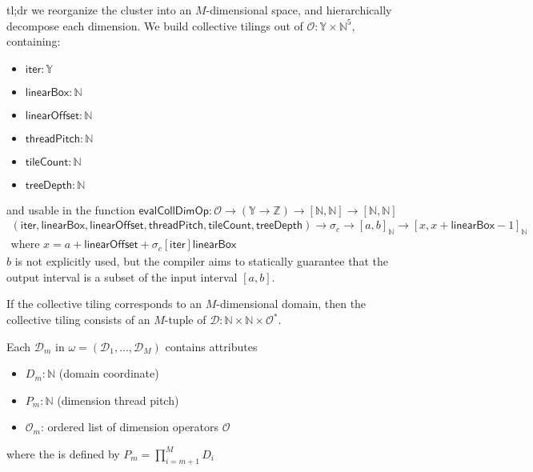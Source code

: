 tl;dr we reorganize the cluster into an $M$-dimensional space, and hierarchically decompose each dimension.
\filbreak
We build collective tilings out of  $\mathcal{O}: \mathbb{Y} \times \mathbb{N}^5$, containing:
\begin{itemize}
  \item $\mathsf{iter}: \mathbb{Y}$
  \filbreak
  \item $\mathsf{linearBox}: \mathbb{N}$
  \filbreak
  \item $\mathsf{linearOffset}: \mathbb{N}$
  \filbreak
  \item $\mathsf{threadPitch}: \mathbb{N}$
  \filbreak
  \item $\mathsf{tileCount}: \mathbb{N}$
  \filbreak
  \item $\mathsf{treeDepth}: \mathbb{N}$
\end{itemize}
\filbreak
and usable in the function $\mathsf{evalCollDimOp}: \mathcal{O} \to (\mathbb{Y} \to \mathbb{Z}) \to [\mathbb{N}, \mathbb{N}] \to [\mathbb{N}, \mathbb{N}]$
\begin{gather*}
    (\mathsf{iter}, \mathsf{linearBox}, \mathsf{linearOffset}, \mathsf{threadPitch}, \mathsf{tileCount}, \mathsf{treeDepth}) \to
    \sigma_c \to
    [a, b]_\mathbb{N} \to
    [x, x + \mathsf{linearBox} - 1]_\mathbb{N} \\
    \text{where } x = a + \mathsf{linearOffset} + \sigma_c[\mathsf{iter}] \mathsf{linearBox}
\end{gather*}
$b$ is not explicitly used, but the compiler aims to statically guarantee that the output interval is a subset of the input interval $[a, b]$.

\filbreak
If the collective tiling corresponds to an $M$-dimensional domain, then the collective tiling consists of an $M$-tuple of  $\mathcal{D}: \mathbb{N} \times \mathbb{N} \times \mathcal{O}^*$.

\filbreak
Each $\mathcal{D}_m$ in $\omega = (\mathcal{D}_1, ..., \mathcal{D}_M)$ contains attributes
\begin{itemize}
  \item $D_m: \mathbb{N}$ (domain coordinate)
  \filbreak
  \item $P_m: \mathbb{N}$ (dimension thread pitch)
  \filbreak
  \item $\mathcal{O}_m$: ordered list of dimension operators $\mathcal{O}$
\end{itemize}
where the  is defined by $P_m = \prod_{i = m+1}^M D_i$


